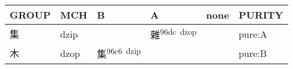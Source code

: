 \documentclass[14pt,a4paper]{scrartcl}
\begin{document}
\begin{longtable}[c]{@{}llllll@{}}
\toprule
\begin{minipage}[b]{0.14\columnwidth}\raggedright\strut
GROUP
\strut\end{minipage} &
\begin{minipage}[b]{0.14\columnwidth}\raggedright\strut
MCH
\strut\end{minipage} &
\begin{minipage}[b]{0.14\columnwidth}\raggedright\strut
B
\strut\end{minipage} &
\begin{minipage}[b]{0.14\columnwidth}\raggedright\strut
A
\strut\end{minipage} &
\begin{minipage}[b]{0.14\columnwidth}\raggedright\strut
none
\strut\end{minipage} &
\begin{minipage}[b]{0.14\columnwidth}\raggedright\strut
PURITY
\strut\end{minipage}\tabularnewline
\midrule
\endhead
\begin{minipage}[t]{0.14\columnwidth}\raggedright\strut
集
\strut\end{minipage} &
\begin{minipage}[t]{0.14\columnwidth}\raggedright\strut
dzip
\strut\end{minipage} &
\begin{minipage}[t]{0.14\columnwidth}\raggedright\strut
\strut\end{minipage} &
\begin{minipage}[t]{0.14\columnwidth}\raggedright\strut
雜\textsuperscript{96dc~dzop}
\strut\end{minipage} &
\begin{minipage}[t]{0.14\columnwidth}\raggedright\strut
\strut\end{minipage} &
\begin{minipage}[t]{0.14\columnwidth}\raggedright\strut
pure:A
\strut\end{minipage}\tabularnewline
\begin{minipage}[t]{0.14\columnwidth}\raggedright\strut
木
\strut\end{minipage} &
\begin{minipage}[t]{0.14\columnwidth}\raggedright\strut
dzop
\strut\end{minipage} &
\begin{minipage}[t]{0.14\columnwidth}\raggedright\strut
集\textsuperscript{96c6~dzip}
\strut\end{minipage} &
\begin{minipage}[t]{0.14\columnwidth}\raggedright\strut
\strut\end{minipage} &
\begin{minipage}[t]{0.14\columnwidth}\raggedright\strut
\strut\end{minipage} &
\begin{minipage}[t]{0.14\columnwidth}\raggedright\strut
pure:B
\strut\end{minipage}\tabularnewline
\bottomrule
\end{longtable}
\end{document}
